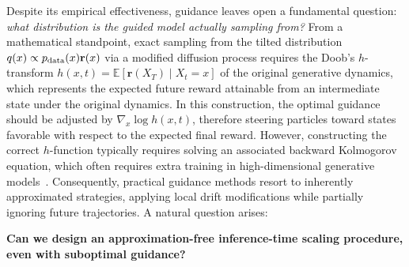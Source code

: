 \documentclass{article}
\theoremstyle{plain}
\theoremstyle{definition}
\theoremstyle{remark}
\newcommand{\yplu}[1]{{\color{orange}{ [\textbf{Yiping:}} #1]}}
\begin{document}
Despite its empirical effectiveness, guidance leaves open a fundamental question: \emph{what distribution is the guided model actually sampling from?} From a mathematical standpoint, exact sampling from the tilted distribution \(q(x) \propto p_{\rm data}(x) \mathbf{r}(x)\) via a modified diffusion process requires the Doob's $h$-transform \(h(x,t)=\mathbb{E}\left[\mathbf{r}(X_T)\mid X_t=x\right]\) \cite{denker2024deft,tang2024stochastic,nguyen2025h,sabour2025test,li2024derivative,yang2024guidance,zhu2026training} of the original generative dynamics, which represents the expected future reward attainable from an intermediate state under the original dynamics. In this construction, the optimal guidance should be adjusted by \(\nabla_x \log h(x,t)\), therefore steering particles toward states favorable with respect to the expected final reward. However, constructing the correct $h$-function typically requires solving an associated backward Kolmogorov equation, which often requires extra training in high-dimensional generative models~\cite{domingo2024adjoint,havens2025adjoint,liu2025adjoint,albergo2024nets}. Consequently, practical guidance methods resort to inherently approximated strategies, applying local drift modifications while partially ignoring future trajectories. A natural question arises:
\vspace{-0.1in}
\begin{center}
\begin{tcolorbox}[colback=gray!15, colframe=gray!15, boxrule=0pt, arc=6pt, left=6pt, right=6pt, top=4pt, bottom=4pt]
\centering\textbf{Can we design an approximation-free inference-time scaling  procedure, even with suboptimal guidance?}
\end{tcolorbox}
\end{center}






\end{document}
